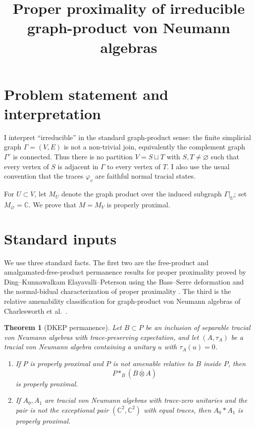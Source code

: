 \documentclass[12pt]{article}
\newtheorem{theorem}{Theorem}
\newcommand{\bbarotimes}{\mathbin{\overline{\otimes}}}
\begin{document}
\title{Proper proximality of irreducible graph-product von Neumann algebras}
\author{}
\date{}
\maketitle

\section*{Problem statement and interpretation}

I interpret ``irreducible'' in the standard graph-product sense: the finite
simplicial graph $\Gamma=(V,E)$ is not a non-trivial join, equivalently the
complement graph $\Gamma^c$ is connected.  Thus there is no partition
$V=S\sqcup T$ with $S,T\ne\varnothing$ such that every vertex of $S$ is adjacent
in $\Gamma$ to every vertex of $T$.  I also use the usual convention that the
traces $\varphi_v$ are faithful normal tracial states.

For $U\subset V$, let $M_U$ denote the graph product over the induced subgraph
$\Gamma|_U$; set $M_\varnothing=\mathbb C$.  We prove that
$M=M_V$ is properly proximal.

\section*{Standard inputs}

We use three standard facts.  The first two are the free-product and
amalgamated-free-product permanence results for proper proximality proved by
Ding--Kunnawalkam Elayavalli--Peterson using the Bass--Serre deformation and
the normal-bidual characterization of proper proximality \cite{DKEP}.  The
third is the relative amenability classification for graph-product von Neumann
algebras of Charlesworth et al.\ \cite{CDHJKN}.

\begin{theorem}[DKEP permanence]\label{thm:perm}
Let $B\subset P$ be an inclusion of separable tracial von Neumann algebras with
trace-preserving expectation, and let $(A,\tau_A)$ be a tracial von Neumann
algebra containing a unitary $u$ with $\tau_A(u)=0$.
\begin{enumerate}
\item If $P$ is properly proximal and $P$ is not amenable relative to $B$ inside
$P$, then
\[
        P *_B (B\bbarotimes A)
\]
is properly proximal.
\item If $A_0,A_1$ are tracial von Neumann algebras with trace-zero unitaries
and the pair is not the exceptional pair $(\mathbb C^2,\mathbb C^2)$ with
equal traces, then $A_0*A_1$ is properly proximal.
\end{enumerate}
\end{theorem}
\end{document}
